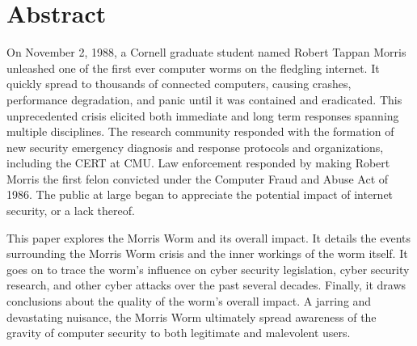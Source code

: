 \section*{Abstract}

On November 2, 1988, a Cornell graduate student named Robert Tappan Morris
unleashed one of the first ever computer worms on the fledgling internet. It
quickly spread to thousands of connected computers, causing crashes, performance
degradation, and panic until it was contained and eradicated. This unprecedented
crisis elicited both immediate and long term responses spanning multiple
disciplines. The research community responded with the formation of new security
emergency diagnosis and response protocols and organizations, including the CERT
at CMU. Law enforcement responded by making Robert Morris the first felon
convicted under the Computer Fraud and Abuse Act of 1986. The public at large
began to appreciate the potential impact of internet security, or a lack
thereof.

This paper explores the Morris Worm and its overall impact. It details the
events surrounding the Morris Worm crisis and the inner workings of the worm
itself. It goes on to trace the worm's influence on cyber security legislation,
cyber security research, and other cyber attacks over the past several decades.
Finally, it draws conclusions about the quality of the worm's overall impact. A
jarring and devastating nuisance, the Morris Worm ultimately spread awareness
of the gravity of computer security to both legitimate and malevolent users.
